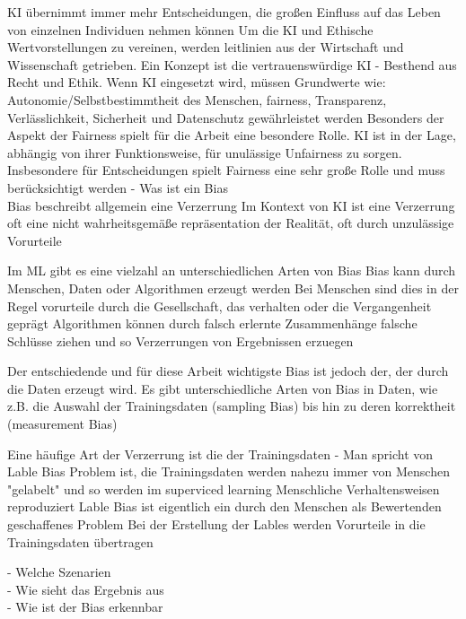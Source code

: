     KI übernimmt immer mehr Entscheidungen, die großen Einfluss auf das Leben von einzelnen Individuen nehmen können
    Um die KI und Ethische Wertvorstellungen zu vereinen, werden leitlinien aus der Wirtschaft und Wissenschaft getrieben.
    Ein Konzept ist die vertrauenswürdige KI - Besthend aus Recht und Ethik. 
    Wenn KI eingesetzt wird, müssen Grundwerte wie: Autonomie/Selbstbestimmtheit des Menschen, fairness, Transparenz, Verlässlichkeit, Sicherheit und Datenschutz gewährleistet werden
    Besonders der Aspekt der Fairness spielt für die Arbeit eine besondere Rolle.
    KI ist in der Lage, abhängig von ihrer Funktionsweise, für unulässige Unfairness zu sorgen. Insbesondere für Entscheidungen spielt Fairness eine sehr große Rolle und muss berücksichtigt werden
- Was ist ein Bias \\
    Bias beschreibt allgemein eine Verzerrung
    Im Kontext von KI ist eine Verzerrung oft eine nicht wahrheitsgemäße repräsentation der Realität, oft durch unzulässige Vorurteile
    
    Im ML gibt es eine vielzahl an unterschiedlichen Arten von Bias
    Bias kann durch Menschen, Daten oder Algorithmen erzeugt werden
    Bei Menschen sind dies in der Regel vorurteile durch die Gesellschaft, das verhalten oder die Vergangenheit geprägt
    Algorithmen können durch falsch erlernte Zusammenhänge falsche Schlüsse ziehen und so Verzerrungen von Ergebnissen erzuegen

    Der entschiedende und für diese Arbeit wichtigste Bias ist jedoch der, der durch die Daten erzeugt wird.
    Es gibt unterschiedliche Arten von Bias in Daten, wie z.B. die Auswahl der Trainingsdaten (sampling Bias) bis hin zu deren korrektheit (measurement Bias)
    
    Eine häufige Art der Verzerrung ist die der Trainingsdaten - Man spricht von Lable Bias 
    Problem ist, die Trainingsdaten werden nahezu immer von Menschen "gelabelt" und so werden im superviced learning Menschliche Verhaltensweisen reproduziert
    Lable Bias ist eigentlich ein durch den Menschen als Bewertenden geschaffenes Problem
    Bei der Erstellung der Lables werden Vorurteile in die Trainingsdaten übertragen 

- Welche Szenarien\\
- Wie sieht das Ergebnis aus\\
- Wie ist der Bias erkennbar

